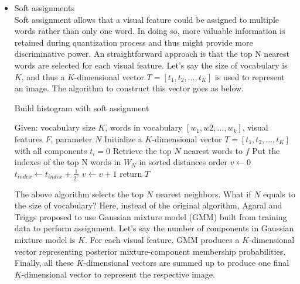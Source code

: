 	\begin{itemize}
		\item{Soft assignments}\\
		Soft assignment allows that a visual feature could be assigned to multiple words rather than only one word. In doing so, more valuable information is retained during quantization process and thus might provide more discriminative power. An straightforward approach \cite{jiang2007towards} is that the top N nearest words are selected for each visual feature. Let's say the size of vocabulary is $K$, and thus a $K$-dimensional vector $T = [t_1, t_2,..., t_K]$  is used to represent an image. The algorithm to construct this vector goes as below.\\

		  \begin{algorithm}
		  \caption{Build histogram with soft assignment}
		  \begin{algorithmic}[1]
		  \State Given: vocabulary size $K$, words in vocabulary $[w_1, w2,..., w_k]$, visual features $F$, parameter $N$
		  \State Initialize a $K$-dimensional vector $T = [t_1, t_2,..., t_K]$ with all components $t_i = 0$ 
		  \State
		  \State Retrieve the top $N$ nearest words to $f$
		  \State Put the indexes of the top N words in $W_N$ in sorted distances order
			  \State $v \gets 0$
			  	\State $t_{index} \gets t_{index} + \frac{1}{2^v}$
			  	\State $v \gets v + 1$
			  \EndFor
		  \EndFor
		  \State
		  \State return $T$
		  \end{algorithmic}
		  \end{algorithm}

		 The above algorithm selects the top $N$ nearest neighbors. What if $N$ equals to the size of vocabulary? Here, instead of the original algorithm, Agaral and Triggs \cite{agarwal2006hyperfeatures} proposed to use Gaussian mixture model (GMM) built from training data to perform assignment. Let's say the number of components in Gaussian mixture model is $K$. For each visual feature, GMM produces a $K$-dimensional vector representing posterior mixture-component membership probabilities. Finally, all these $K$-dimensional vectors are summed up to produce one final $K$-dimensional vector to represent the respective image. 


\end{itemize}
